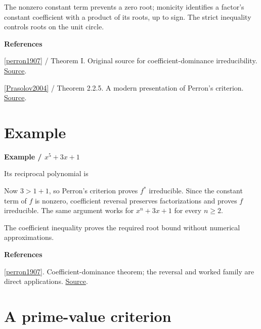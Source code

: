 \documentclass[11pt,a4paper,oneside,openany]{book}
\newcommand{\atlasdisplay}[1]{\par\begingroup\centering\vspace{3pt}\noindent\adjustbox{max width=\linewidth}{\(\displaystyle #1\)}\par\vspace{5pt}\endgroup}
\newenvironment{sources}{\par\smallskip\begingroup\footnotesize\color{atlasgray}\leftskip=10pt\setlength{\parskip}{2pt}}{\par\endgroup\smallskip}
\begin{document}
\color{black} The nonzero constant term prevents a zero root; monicity identifies a factor's constant coefficient with a product of its roots, up to sign. The strict inequality controls roots on the unit circle.\par
\begin{sources}
\textbf{References}\par\smallskip
\noindent\hyperlink{ref:perron1907}{[perron1907]} / Theorem I. Original source for coefficient-dominance irreducibility. \href{https://www.degruyterbrill.com/document/doi/10.1515/crll.1907.132.288/html}{Source}.\par
\noindent\hyperlink{ref:Prasolov2004}{[Prasolov2004]} / Theorem 2.2.5. A modern presentation of Perron's criterion. \href{https://link.springer.com/book/10.1007/978-3-642-03980-5}{Source}.\par
\end{sources}\color{black}
\section{Example}

\begin{atlasblock}[standard]
\textbf{\sffamily Example  /  \(x^5+3x+1\)}\par\smallskip
\color{black} Its reciprocal polynomial is\par

\atlasdisplay{f^*(x)=x^5f(1/x)=x^5+3x^4+1.}

\color{black} Now \(3>1+1\), so Perron's criterion proves \(f^*\) irreducible. Since the constant term of \(f\) is nonzero, coefficient reversal preserves factorizations and proves \(f\) irreducible. The same argument works for \(x^n+3x+1\) for every \(n\ge2\).\par
\color{black} The coefficient inequality proves the required root bound without numerical approximations.\par
\end{atlasblock}\color{black}
\begin{sources}
\textbf{References}\par\smallskip
\noindent\hyperlink{ref:perron1907}{[perron1907]}. Coefficient-dominance theorem; the reversal and worked family are direct applications. \href{https://www.degruyterbrill.com/document/doi/10.1515/crll.1907.132.288/html}{Source}.\par
\end{sources}\color{black}
\section{A prime-value criterion}
\end{document}
